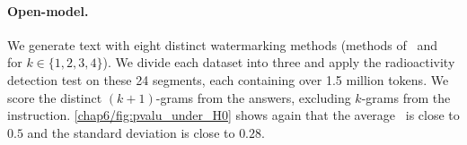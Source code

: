 \paragraph{Open-model.}
We generate text with eight distinct watermarking methods (methods of~\citet{aaronson2023watermarking} and ~\citet{kirchenbauer2023watermark} for $k\in\{1,2,3,4\}$).
We divide each dataset into three and apply the radioactivity detection test on these 24 segments, each containing over 1.5 million tokens. 
We score the distinct $(k+1)$-grams from the answers, excluding $k$-grams from the instruction.
\autoref{chap6/fig:pvalu_under_H0} shows again that the average \pval\ is close to $0.5$ and the standard deviation is close to $0.28$.

